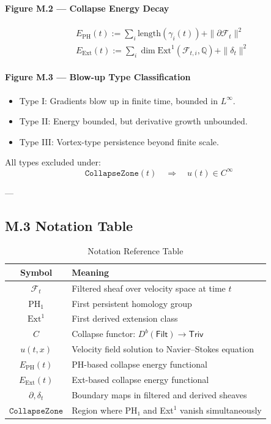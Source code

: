 \documentclass[11pt]{article}
\begin{document}
{{{\paragraph{Figure M.2 — Collapse Energy Decay}

\[
\begin{aligned}
& E_{\mathrm{PH}}(t) := \sum_i \mathrm{length}(\gamma_i(t)) + \|\partial \mathcal{F}_t\|^2 \\
& E_{\mathrm{Ext}}(t) := \sum_i \dim \mathrm{Ext}^1(\mathcal{F}_{t,i}, \mathbb{Q}) + \|\delta_t\|^2
\end{aligned}
\]

\paragraph{Figure M.3 — Blow-up Type Classification}

\begin{itemize}
  \item Type I: Gradients blow up in finite time, bounded in \( L^\infty \).
  \item Type II: Energy bounded, but derivative growth unbounded.
  \item Type III: Vortex-type persistence beyond finite scale.
\end{itemize}

All types excluded under:
\[
\texttt{CollapseZone}(t) \quad \Rightarrow \quad u(t) \in C^\infty
\]

---

\subsection*{M.3 Notation Table}

\begin{table}[h!]
\centering
\begin{tabular}{|c|l|}
\hline
\textbf{Symbol} & \textbf{Meaning} \\
\hline
\( \mathcal{F}_t \) & Filtered sheaf over velocity space at time \( t \) \\
\( \mathrm{PH}_1 \) & First persistent homology group \\
\( \mathrm{Ext}^1 \) & First derived extension class \\
\( C \) & Collapse functor: \( D^b(\mathsf{Filt}) \to \mathsf{Triv} \) \\
\( u(t,x) \) & Velocity field solution to Navier–Stokes equation \\
\( E_{\mathrm{PH}}(t) \) & PH-based collapse energy functional \\
\( E_{\mathrm{Ext}}(t) \) & Ext-based collapse energy functional \\
\( \partial, \delta_t \) & Boundary maps in filtered and derived sheaves \\
\( \texttt{CollapseZone} \) & Region where PH₁ and Ext$^1$ vanish simultaneously \\
\hline
\end{tabular}
\caption{Notation Reference Table}
\end{table}

}}}
\end{document}
